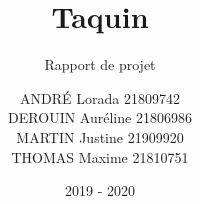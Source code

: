 \documentclass[report]{BetterDocument}
\title{Taquin}
\subtitle{Rapport de projet}
\author{ANDRÉ Lorada 21809742\\
	DEROUIN Auréline 21806986\\
	MARTIN Justine 21909920\\
	THOMAS Maxime 21810751
}
\date{2019 - 2020}
\institute{Unicaen}
\begin{document}
	\pageDeGarde

	\tableDesMatieres

	

	

	

	

	
\end{document}

